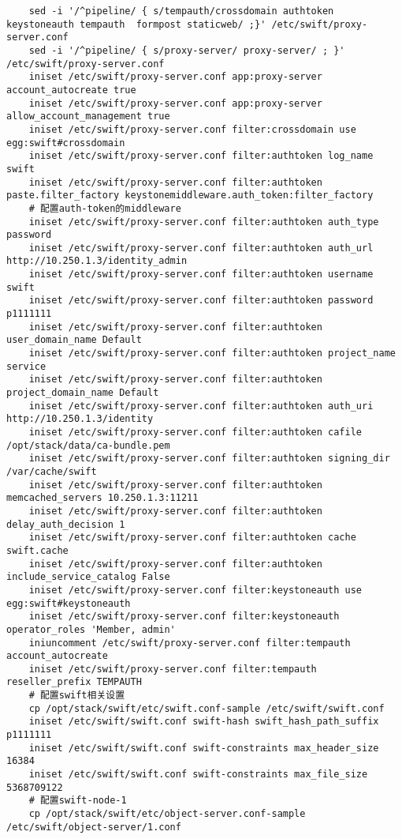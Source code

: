 \documentclass[a4paper,left=1.5cm,right=1.5cm,11pt]{article}
\begin{document}
\begin{lstlisting}
	sed -i '/^pipeline/ { s/tempauth/crossdomain authtoken keystoneauth tempauth  formpost staticweb/ ;}' /etc/swift/proxy-server.conf
	sed -i '/^pipeline/ { s/proxy-server/ proxy-server/ ; }' /etc/swift/proxy-server.conf
    iniset /etc/swift/proxy-server.conf app:proxy-server account_autocreate true
    iniset /etc/swift/proxy-server.conf app:proxy-server allow_account_management true
    iniset /etc/swift/proxy-server.conf filter:crossdomain use egg:swift#crossdomain
    iniset /etc/swift/proxy-server.conf filter:authtoken log_name swift
    iniset /etc/swift/proxy-server.conf filter:authtoken paste.filter_factory keystonemiddleware.auth_token:filter_factory
	# 配置auth-token的middleware
	iniset /etc/swift/proxy-server.conf filter:authtoken auth_type password
    iniset /etc/swift/proxy-server.conf filter:authtoken auth_url http://10.250.1.3/identity_admin
    iniset /etc/swift/proxy-server.conf filter:authtoken username swift
    iniset /etc/swift/proxy-server.conf filter:authtoken password p1111111
    iniset /etc/swift/proxy-server.conf filter:authtoken user_domain_name Default
    iniset /etc/swift/proxy-server.conf filter:authtoken project_name service
    iniset /etc/swift/proxy-server.conf filter:authtoken project_domain_name Default
    iniset /etc/swift/proxy-server.conf filter:authtoken auth_uri http://10.250.1.3/identity
    iniset /etc/swift/proxy-server.conf filter:authtoken cafile /opt/stack/data/ca-bundle.pem
    iniset /etc/swift/proxy-server.conf filter:authtoken signing_dir /var/cache/swift
    iniset /etc/swift/proxy-server.conf filter:authtoken memcached_servers 10.250.1.3:11211
    iniset /etc/swift/proxy-server.conf filter:authtoken delay_auth_decision 1
    iniset /etc/swift/proxy-server.conf filter:authtoken cache swift.cache
    iniset /etc/swift/proxy-server.conf filter:authtoken include_service_catalog False
    iniset /etc/swift/proxy-server.conf filter:keystoneauth use egg:swift#keystoneauth
    iniset /etc/swift/proxy-server.conf filter:keystoneauth operator_roles 'Member, admin'
    iniuncomment /etc/swift/proxy-server.conf filter:tempauth account_autocreate
    iniset /etc/swift/proxy-server.conf filter:tempauth reseller_prefix TEMPAUTH
	# 配置swift相关设置
	cp /opt/stack/swift/etc/swift.conf-sample /etc/swift/swift.conf
    iniset /etc/swift/swift.conf swift-hash swift_hash_path_suffix p1111111
    iniset /etc/swift/swift.conf swift-constraints max_header_size 16384
    iniset /etc/swift/swift.conf swift-constraints max_file_size 5368709122
	# 配置swift-node-1
	cp /opt/stack/swift/etc/object-server.conf-sample /etc/swift/object-server/1.conf

\end{lstlisting}
\end{document}
